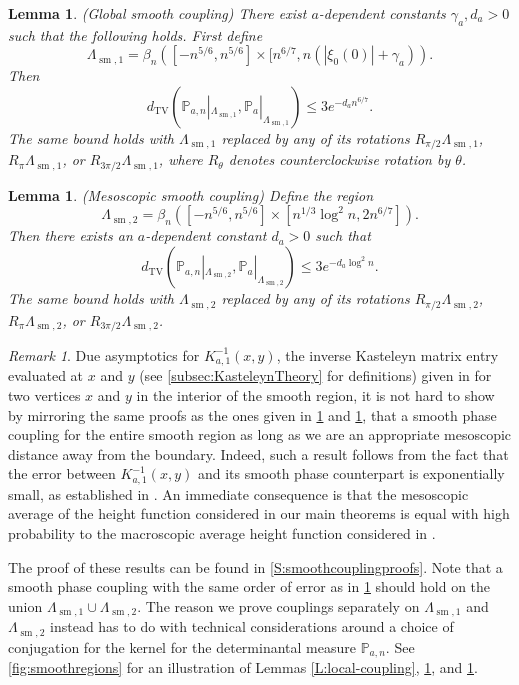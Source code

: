 \documentclass[11pt,twoside]{amsart}
\theoremstyle{plain}
\newtheorem{lem}[thm]{Lemma}
\numberwithin{quest}{section}
\theoremstyle{remark}
\newtheorem{rem}{Remark}
\numberwithin{rem}{section}
\theoremstyle{definition}
\renewcommand{\P}{\mathbb{P}}
\begin{document}
	\begin{lem} (Global smooth coupling)
		\label{L:global-coupling-1} 
	There exist $a$-dependent constants $\gamma_a, d_a > 0$ such that the following holds. First define
		$$
		\Lambda_{\operatorname{sm}, 1} = \beta_n([-n^{5/6} , n^{5/6}] \times [n^{6/7}, n(|\xi_0(0)| + \gamma_a)). 
		$$
		Then
		$$
		d_{\operatorname{TV}}(\P_{a, n}|_{\Lambda_{\operatorname{sm}, 1}}, \P_a|_{\Lambda_{\operatorname{sm}, 1}}) \le 3 e^{-d_a n^{6/7}}.
		$$
		The same bound holds with $\Lambda_{\operatorname{sm}, 1}$ replaced by any of its rotations $R_{\pi/2} \Lambda_{\operatorname{sm}, 1}$, $R_{\pi} \Lambda_{\operatorname{sm}, 1}$, or $R_{3\pi/2} \Lambda_{\operatorname{sm}, 1}$, where $R_\theta$ denotes counterclockwise rotation by $\theta$.
	\end{lem}
	
	\begin{lem} (Mesoscopic smooth coupling)
		\label{L:global-coupling-2}
		Define the region
		$$
		\Lambda_{\operatorname{sm}, 2} = \beta_n([-n^{5/6} , n^{5/6}] \times [n^{1/3} \log^2 n, 2 n^{6/7}]). 
		$$
		Then there exists an $a$-dependent constant $d_a > 0$ such that
		$$
		d_{\operatorname{TV}}(\P_{a, n}|_{\Lambda_{\operatorname{sm}, 2}}, \P_a|_{\Lambda_{\operatorname{sm}, 2}}) \le 3 e^{- d_a \log^2 n}.
		$$
		The same bound holds with $\Lambda_{\operatorname{sm}, 2}$ replaced by any of its rotations $R_{\pi/2} \Lambda_{\operatorname{sm}, 2}$, $R_{\pi} \Lambda_{\operatorname{sm}, 2}$, or $R_{3\pi/2} \Lambda_{\operatorname{sm}, 2}$.
	\end{lem}
	{\begin{rem}
			Due asymptotics for $K^{-1}_{a,1}(x,y)$, the inverse Kasteleyn matrix entry evaluated at $x$ and $y$ (see \cref{subsec:KasteleynTheory} for definitions) given in  \cite[Lemma 5.3]{BN25} for two vertices $x$ and $y$ in the interior of the smooth region, it is not hard to show by mirroring the same proofs as the ones given in \cref{L:global-coupling-1} and \cref{L:global-coupling-2}, that a smooth phase coupling for the entire smooth region as long as we are an appropriate mesoscopic distance away from the boundary.  Indeed, such a result follows from the fact that the error between $K^{-1}_{a,1}(x,y)$ and its smooth phase counterpart is exponentially small, as established in \cite[Lemma 5.3]{BN25}.  An immediate consequence is that the mesoscopic average of the height function considered in our main theorems is equal with high probability to the macroscopic average height function considered in \cite{BN25}. 
		\end{rem}}	
	The proof of these results can be found in \cref{S:smoothcouplingproofs}. Note that a smooth phase coupling with the same order of error as in \cref{L:global-coupling-2} should hold on the union $\Lambda_{\operatorname{sm}, 1} \cup \Lambda_{\operatorname{sm}, 2}$. The reason we prove couplings separately on $\Lambda_{\operatorname{sm}, 1}$ and $\Lambda_{\operatorname{sm}, 2}$ instead has to do with technical considerations around a choice of conjugation for the kernel for the determinantal measure $\P_{a, n}$.
	See \cref{fig:smoothregions} for an illustration of Lemmas \ref{L:local-coupling}, \ref{L:global-coupling-1}, and \ref{L:global-coupling-2}.
	
\end{document}
